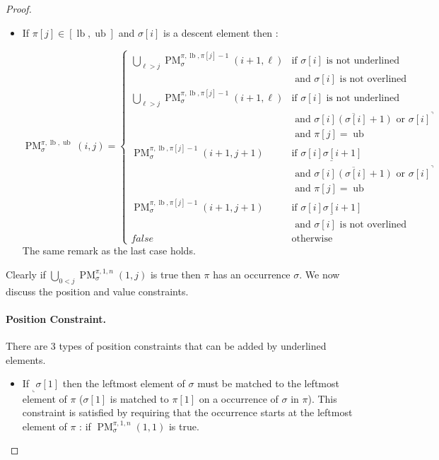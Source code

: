 \documentclass[a4paper]{llncs}
\newcommand{\ptext}{\pi}
\newcommand{\ppattern}{\sigma}
\DeclareMathOperator{\PMa}{PM}
\newcommand{\PM}[6]{\PMa_{{#1}}^{{#2},{#3},{#4}}({#5},{#6})}
\DeclareMathOperator{\lb}{lb}
\DeclareMathOperator{\ub}{ub}
\begin{document}
\begin{proof}
\begin{itemize}
	\item If $\ptext[j] \in [\lb,\ub]$ and $\ppattern[i]$ is a descent element then :

	$$
	\PM{\sigma}{\ptext}{\lb}{\ub}{i}{j}=
	\begin{cases}
			\bigcup_{\ell>j} \PM{\sigma}{\ptext}{\lb}{\ptext[j]-1}{i+1}{\ell}
				& \text{if $\ppattern[i]$ is not underlined } \\
				& \text{ and $\ppattern[i]$ is not overlined} \\
			\bigcup_{\ell>j} \PM{\sigma}{\ptext}{\lb}{\ptext[j]-1}{i+1}{\ell}
				& \text{if $\ppattern[i]$ is not underlined } \\
				& \text{ and $\overline{\ppattern[i](\ppattern[i]+1)}$ or ${\ppattern[i]}^\urcorner$}\\
				& \text{ and $\ptext[j]=\ub$} \\
			\PM{\sigma}{\ptext}{\lb}{\ptext[j]-1}{i+1}{j+1}
				& \text{if $\underline{\ppattern[i]\ppattern[i+1]}$ } \\
				& \text{ and $\overline{\ppattern[i](\ppattern[i]+1)}$ or ${\ppattern[i]}^\urcorner$}\\
				& \text{ and $\ptext[j]=\ub$} \\
			\PM{\sigma}{\ptext}{\lb}{\ptext[j]-1}{i+1}{j+1}
				& \text{if $\underline{\ppattern[i]\ppattern[i+1]}$ } \\
				& \text{ and $\ppattern[i]$ is not overlined} \\
			false & \text{otherwise}
	\end{cases}
	$$	
	The same remark as the last case holds.

\end{itemize}

Clearly if $\bigcup_{0<j} \PM{\sigma}{\ptext}{1}{n}{1}{j}$ is true then $\pi$ has an occurrence $\sigma$. We now discuss the position and value constraints.
\paragraph{Position Constraint.} There are 3 types of position constraints that can be added by underlined elements.
\begin{itemize}
	\item If $_\llcorner{\sigma[1]}$ then the leftmost element of $\sigma$  must be matched to the leftmost element of $\pi$ ($\ppattern[1]$ is matched to $\ptext[1]$ on a occurrence of $\ppattern$ in $\ptext$). This constraint is satisfied by requiring that the occurrence starts at the leftmost element of $\ptext$ : if  $\PM{\sigma}{\ptext}{1}{n}{1}{1}$ is true.
	

\end{itemize}
\end{proof}
\end{document}
